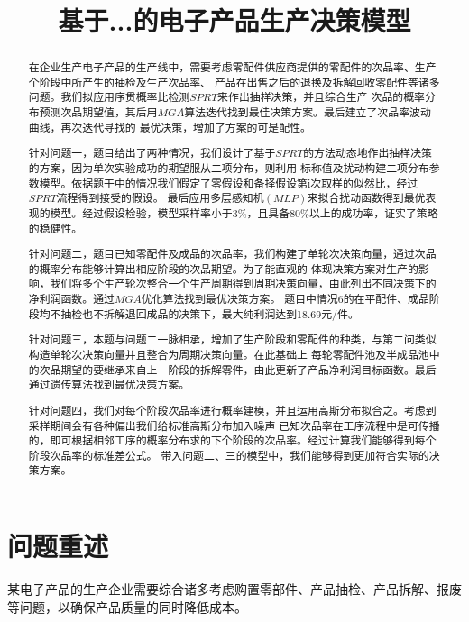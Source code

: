 \documentclass[withoutpreface,bwprint]{cumcmthesis} %
\title{基于...的电子产品生产决策模型}
\begin{document}
\maketitle
\begin{abstract}
	在企业生产电子产品的生产线中，需要考虑零配件供应商提供的零配件的次品率、生产个阶段中所产生的抽检及生产次品率、
	产品在出售之后的退换及拆解回收零配件等诸多问题。我们拟应用序贯概率比检测$SPRT$来作出抽样决策，并且综合生产
	次品的概率分布预测次品期望值，其后用$MGA$算法迭代找到最佳决策方案。最后建立了次品率波动曲线，再次迭代寻找的
	最优决策，增加了方案的可是配性。

	针对问题一，题目给出了两种情况，我们设计了基于$SPRT$\cite{SPRT}的方法动态地作出抽样决策的方案，因为单次实验成功的期望服从二项分布，则利用
	标称值及扰动构建二项分布参数模型。依据题干中的情况我们假定了零假设和备择假设第i次取样的似然比，经过$SPRT$流程得到接受的假设。
	最后应用多层感知机$(MLP)$来拟合扰动函数得到最优表现的模型。经过假设检验，模型采样率小于3\%，且具备80\%以上的成功率，证实了策略的稳健性。

	针对问题二，题目已知零配件及成品的次品率，我们构建了单轮次决策向量，通过次品的概率分布能够计算出相应阶段的次品期望。为了能直观的
	体现决策方案对生产的影响，我们将多个生产轮次整合一个生产周期得到周期决策向量，由此列出不同决策下的净利润函数。通过$MGA$优化算法找到最优决策方案。
	题目中情况6的在平配件、成品阶段均不抽检也不拆解退回成品的决策下，最大纯利润达到18.69元/件。

	针对问题三，本题与问题二一脉相承，增加了生产阶段和零配件的种类，与第二问类似构造单轮次决策向量并且整合为周期决策向量。在此基础上
	每轮零配件池及半成品池中的次品期望的要继承来自上一阶段的拆解零件，由此更新了产品净利润目标函数。最后通过遗传算法找到最优决策方案。

	针对问题四，我们对每个阶段次品率进行概率建模，并且运用高斯分布拟合之。考虑到采样期间会有各种偏出我们给标准高斯分布加入噪声
	已知次品率在工序流程中是可传播的，即可根据相邻工序的概率分布求的下个阶段的次品率。经过计算我们能够得到每个阶段次品率的标准差公式。
	带入问题二、三的模型中，我们能够得到更加符合实际的决策方案。

\end{abstract}


\section{问题重述}
某电子产品的生产企业需要综合诸多考虑购置零部件、产品抽检、产品拆解、报废等问题，以确保产品质量的同时降低成本。
\end{document}
